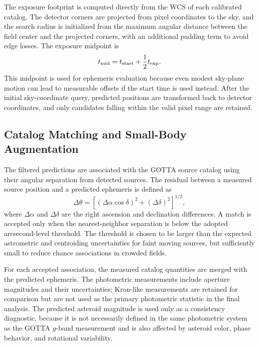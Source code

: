 \documentclass[referee]{raa}
\begin{document}
The exposure footprint is computed directly from the WCS of each calibrated catalog. The detector corners are projected from pixel coordinates to the sky, and the search radius is initialized from the maximum angular distance between the field center and the projected corners, with an additional padding term to avoid edge losses. The exposure midpoint is
\begin{equation}
t_{\rm mid}=t_{\rm start}+\frac{1}{2}t_{\rm exp}.
\end{equation}
This midpoint is used for ephemeris evaluation because even modest sky-plane motion can lead to measurable offsets if the start time is used instead. After the initial sky-coordinate query, predicted positions are transformed back to detector coordinates, and only candidates falling within the valid pixel range are retained.

\subsection{Catalog Matching and Small-Body Augmentation}

The filtered predictions are associated with the GOTTA source catalog using their angular separation from detected sources. The residual between a measured source position and a predicted ephemeris is defined as
\begin{equation}
\Delta\theta =
\left[
(\Delta\alpha\cos\delta)^2 + (\Delta\delta)^2
\right]^{1/2},
\end{equation}
where $\Delta\alpha$ and $\Delta\delta$ are the right ascension and declination differences. A match is accepted only when the nearest-neighbor separation is below the adopted arcsecond-level threshold. The threshold is chosen to be larger than the expected astrometric and centroiding uncertainties for faint moving sources, but sufficiently small to reduce chance associations in crowded fields.

For each accepted association, the measured catalog quantities are merged with the predicted ephemeris. The photometric measurements include aperture magnitudes and their uncertainties; Kron-like measurements are retained for comparison but are not used as the primary photometric statistic in the final analysis. The predicted asteroid magnitude is used only as a consistency diagnostic, because it is not necessarily defined in the same photometric system as the GOTTA $g$-band measurement and is also affected by asteroid color, phase behavior, and rotational variability.
\end{document}
